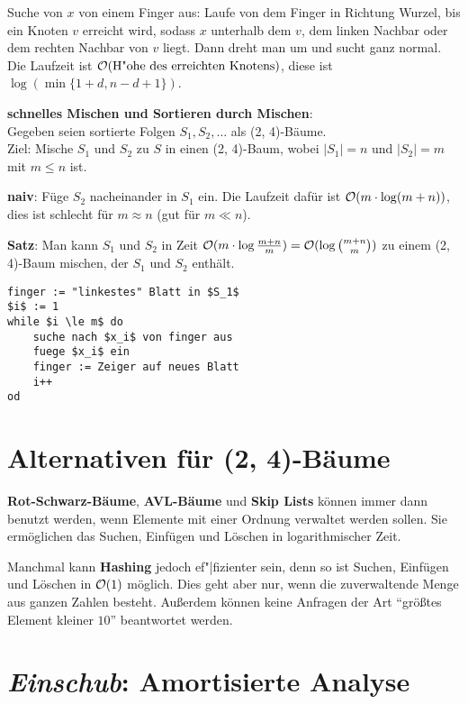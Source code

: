 Suche von $x$ von einem Finger aus:
Laufe von dem Finger in Richtung Wurzel, bis ein Knoten $v$ erreicht wird,
sodass $x$ unterhalb dem $v$, dem linken Nachbar oder dem rechten Nachbar
von $v$ liegt.
Dann dreht man um und sucht ganz normal. \\
Die Laufzeit ist $\mathcal{O}(\text{H"ohe des erreichten Knotens})$,
diese ist $\log(\min\{1 + d, n - d + 1\})$.

\linie

\textbf{schnelles Mischen und Sortieren durch Mischen}: \\
Gegeben seien sortierte Folgen $S_1, S_2, \dotsc$ als (2, 4)-Bäume. \\
Ziel: Mische $S_1$ und $S_2$ zu $S$ in einen (2, 4)-Baum,
wobei $|S_1| = n$ und $|S_2| = m$ mit $m \le n$ ist.

\textbf{naiv}:
Füge $S_2$ nacheinander in $S_1$ ein.
Die Laufzeit dafür ist $\mathcal{O}(m \cdot \log(m + n))$, dies ist schlecht für
$m \approx n$ (gut für $m \ll n$).

\textbf{Satz}:
Man kann $S_1$ und $S_2$ in Zeit
$\mathcal{O}(m \cdot \log \frac{m + n}{m}) = \mathcal{O}(\log \binom{m + n}{m})$ zu einem
(2, 4)-Baum mischen, der $S_1$ und $S_2$ enthält.

\begin{lstlisting}
finger := "linkestes" Blatt in $S_1$
$i$ := 1
while $i \le m$ do
    suche nach $x_i$ von finger aus
    fuege $x_i$ ein
    finger := Zeiger auf neues Blatt
    i++
od
\end{lstlisting}

\pagebreak

\section{%
    Alternativen für (2, 4)-Bäume%
}

\textbf{Rot-Schwarz-Bäume}, \textbf{AVL-Bäume} und \textbf{Skip Lists}
können immer dann benutzt werden, wenn Elemente mit einer Ordnung verwaltet
werden sollen.
Sie ermöglichen das Suchen, Einfügen und Löschen in logarithmischer Zeit.

Manchmal kann \textbf{Hashing} jedoch ef"|fizienter sein, denn so ist
Suchen, Einfügen und Löschen in $\mathcal{O}(1)$ möglich.
Dies geht aber nur, wenn die zuverwaltende Menge aus ganzen Zahlen besteht.
Außerdem können keine Anfragen der Art "`größtes Element kleiner $10$"'
beantwortet werden.

\section{%
    \emph{Einschub}: Amortisierte Analyse%
}


